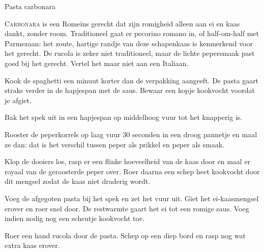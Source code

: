 \begin{recipe}{Pasta carbonara}
\label{recipe:pasta-carbonara}


\lettrine{C}{arbonara} is een Romeins gerecht dat zijn romigheid alleen aan ei en
kaas dankt, zonder room. Traditioneel gaat er pecorino romano in, of half-om-half
met Parmezaan: het zoute, hartige randje van deze schapenkaas is kenmerkend voor
het gerecht. De rucola is zeker niet traditioneel, maar de lichte pepersmaak past
goed bij het gerecht. Vertel het maar niet aan een Italiaan.

\begin{ingredients}
\end{ingredients}

\begin{steps}
  \item Kook de spaghetti een minuut korter dan de verpakking aangeeft. De pasta
        gaart straks verder in de hapjespan met de saus. Bewaar een kopje kookvocht
        voordat je afgiet.
  \item Bak het spek uit in een hapjespan op middelhoog vuur tot het knapperig is.
  \item Rooster de peperkorrels op laag vuur 30 seconden in een droog pannetje en maal ze dan:
        dat is het verschil tussen peper als prikkel en peper als smaak.
  \item Klop de dooiers los, rasp er een flinke hoeveelheid van de kaas door en
        maal er royaal van de geroosterde peper over. Roer daarna een schep heet
        kookvocht door dit mengsel zodat de kaas niet draderig wordt.
  \item Voeg de afgegoten pasta bij het spek en zet het vuur uit. Giet het
        ei-kaasmengsel erover en roer snel door. De restwarmte gaart het ei tot een
        romige saus. Voeg indien nodig nog een scheutje kookvocht toe.
  \item Roer een hand rucola door de pasta. Schep op een diep bord en rasp nog wat
        extra kaas erover.
\end{steps}
\end{recipe}
